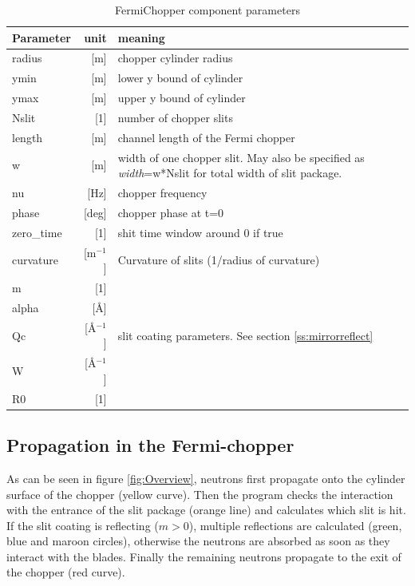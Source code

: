 \begin{table}
  \begin{center}
  {\let\my=\\
    \begin{tabular}{|lr|p{}|}
    \hline
Parameter & unit & meaning \\
    \hline
radius & [m] & chopper cylinder radius \\
ymin   & [m] &   lower y bound of cylinder \\
ymax   & [m] &   upper y bound of cylinder \\
Nslit  & [1] &   number of chopper slits \\
length & [m] &   channel length of the Fermi chopper \\
w      & [m] &   width of one chopper slit. May also be specified as \emph{width}=w*Nslit for total width of slit package. \\
nu & [Hz] &  chopper frequency \\
phase     & [deg] &   chopper phase at t=0 \\
zero\_time & [1] & shit time window around 0 if true \\
curvature & [m$^{-1}$] & Curvature of slits (1/radius of curvature) \\
    \hline
m     & [1] & \\
alpha & [\AA] & \\
Qc    & [\AA$^{-1}$] & slit coating parameters. See section \ref{ss:mirrorreflect} \\
W     & [\AA$^{-1}$] & \\
R0    & [1] & \\
    \hline
    \end{tabular}
    \caption{FermiChopper component parameters}
    \label{t:fc-param}
  }
  \end{center}
\end{table}


\subsection{Propagation in the Fermi-chopper}

As can be seen in figure \ref{fig:Overview}, neutrons first propagate onto the cylinder surface of the chopper (yellow curve). Then the program checks the interaction with the entrance of the slit package (orange line) and calculates which slit is hit. If the slit coating is reflecting ($m > 0$), multiple reflections are calculated (green, blue and maroon circles), otherwise the neutrons are absorbed as soon as they interact with the blades. Finally the remaining neutrons propagate to the exit of the chopper (red curve).

